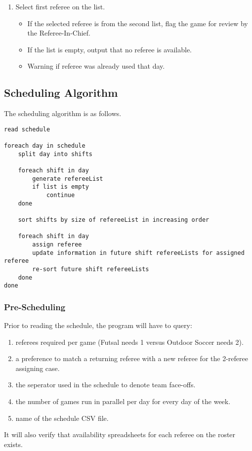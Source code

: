 \documentclass{article}
\begin{document}
\begin{enumerate}
\begin{enumerate}
\end{enumerate}
\item Select first referee on the list.
\begin{itemize}
\item If the selected referee is from the second list, flag the game for review by the Referee-In-Chief.
\item If the list is empty, output that no referee is available.
\item Warning if referee was already used that day.
\end{itemize}
\end{enumerate}

\subsection{Scheduling Algorithm}
The scheduling algorithm is as follows.

\begin{verbatim}
read schedule

foreach day in schedule
    split day into shifts
    
    foreach shift in day
        generate refereeList
        if list is empty
            continue
    done
    
    sort shifts by size of refereeList in increasing order
    
    foreach shift in day
        assign referee
        update information in future shift refereeLists for assigned referee
        re-sort future shift refereeLists
    done
done
\end{verbatim}

\subsubsection{Pre-Scheduling}
Prior to reading the schedule, the program will have to query:
\begin{enumerate}
\item referees required per game (Futsal needs 1 versus Outdoor Soccer needs 2).
\item a preference to match a returning referee with a new referee for the 2-referee assigning case.
\item the seperator used in the schedule to denote team face-offs.
\item the number of games run in parallel per day for every day of the week.
\item name of the schedule CSV file.
\end{enumerate}
It will also verify that availability spreadsheets for each referee on the roster exists.
\end{document}
